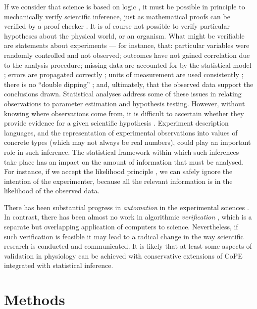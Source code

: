 \documentclass[11pt]{article}
\begin{document}
If we consider that science is based on logic \cite{Jaynes2003}, it
must be possible in principle to mechanically verify scientific
inference, just as mathematical proofs can be verified by a proof
checker \cite{Harrison2009}. It is of course not possible to verify
particular hypotheses about the physical world, or an organism. What
might be verifiable are statements about experiments --- for instance,
that: particular variables were randomly controlled and not observed;
outcomes have not gained correlation due to the analysis procedure;
missing data are accounted for by the statistical model
\cite{Gelman2003}; errors are propagated correctly \cite{Taylor1997};
units of measurement are used consistently \cite{Kennedy1997}; there
is no ``double dipping'' \cite{Kriegeskorte2009}; and, ultimately,
that the observed data support the conclusions drawn. Statistical
analyses address some of these issues in relating observations to
parameter estimation and hypothesis testing. However, without knowing
where observations come from, it is difficult to ascertain whether
they provide evidence for a given scientific hypothesis
\cite{Pool2002}. Experiment description languages, and the
representation of experimental observations into values of concrete
types (which may not always be real numbers), could play an important
role in such inference. The statistical framework within which such
inferences take place has an impact on the amount of information that
must be analysed. For instance, if we accept the likelihood principle
\cite{Jaynes2003}, we can safely ignore the intention of the
experimenter, because all the relevant information is in the
likelihood of the observed data.

There has been substantial progress in \emph{automation} in the
experimental sciences \cite{King2004}. In contrast, there has been
almost no work in algorithmic \emph{verification} \cite{Kropf1999,
  Sadot}, which is a separate but overlapping application of
computers to science. Nevertheless, if such verification is
feasible it may lead to a radical change in the way scientific
research is conducted and communicated. It is likely that at least
some aspects of validation in physiology can be achieved with conservative
extensions of
CoPE integrated with statistical inference.

\section*{Methods}
\end{document}
